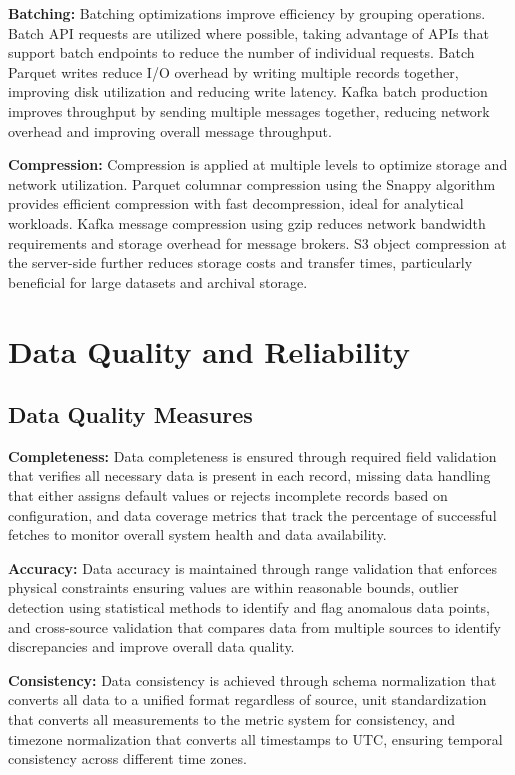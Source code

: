 \documentclass[12pt,a4paper]{article}
\begin{document}
\textbf{Batching:} Batching optimizations improve efficiency by grouping operations. Batch API requests are utilized where possible, taking advantage of APIs that support batch endpoints to reduce the number of individual requests. Batch Parquet writes reduce I/O overhead by writing multiple records together, improving disk utilization and reducing write latency. Kafka batch production improves throughput by sending multiple messages together, reducing network overhead and improving overall message throughput.

\textbf{Compression:} Compression is applied at multiple levels to optimize storage and network utilization. Parquet columnar compression using the Snappy algorithm provides efficient compression with fast decompression, ideal for analytical workloads. Kafka message compression using gzip reduces network bandwidth requirements and storage overhead for message brokers. S3 object compression at the server-side further reduces storage costs and transfer times, particularly beneficial for large datasets and archival storage.


\section{Data Quality and Reliability}

\subsection{Data Quality Measures}

\textbf{Completeness:} Data completeness is ensured through required field validation that verifies all necessary data is present in each record, missing data handling that either assigns default values or rejects incomplete records based on configuration, and data coverage metrics that track the percentage of successful fetches to monitor overall system health and data availability.

\textbf{Accuracy:} Data accuracy is maintained through range validation that enforces physical constraints ensuring values are within reasonable bounds, outlier detection using statistical methods to identify and flag anomalous data points, and cross-source validation that compares data from multiple sources to identify discrepancies and improve overall data quality.

\textbf{Consistency:} Data consistency is achieved through schema normalization that converts all data to a unified format regardless of source, unit standardization that converts all measurements to the metric system for consistency, and timezone normalization that converts all timestamps to UTC, ensuring temporal consistency across different time zones.
\end{document}

